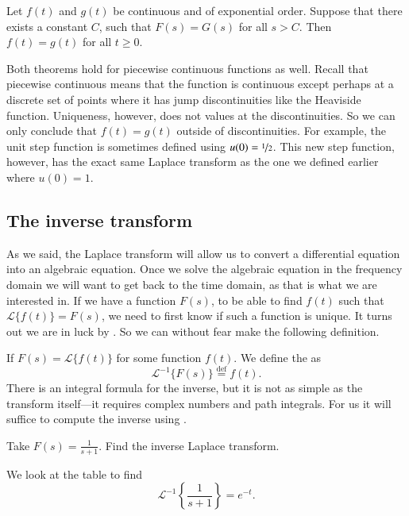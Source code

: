 \documentclass[12pt]{book}
\begin{document}
\begin{theorem}[Uniqueness] \label{lt:uniqthm}
Let $f(t)$ and $g(t)$ be continuous and of exponential order.
Suppose that there exists a constant $C$,
such that $F(s) = G(s)$ for all $s > C$.
Then $f(t) = g(t)$ for all $t \geq 0$.
\end{theorem}

Both theorems hold for piecewise continuous functions as well.
Recall that piecewise continuous means that the function
is continuous except perhaps at a discrete set of points where it has jump
discontinuities like the Heaviside function.  Uniqueness, however, does
not  values at the discontinuities.  So we can only conclude that
$f(t) = g(t)$ outside of discontinuities.  For example, the unit step
function is sometimes defined using $u(0) = \nicefrac{1}{2}$.  This new
step function, however, has the exact same Laplace transform
as the one we defined earlier where $u(0) = 1$.

\subsection{The inverse transform}

As we said, the Laplace transform will allow us to convert a differential
equation into an algebraic equation.  Once we solve the
algebraic equation in the frequency domain we will want to get back to the
time domain, as that is what we are interested in.
If we have a function $F(s)$, to be able
to find $f(t)$ such that $\mathcal{L} \{ f(t) \} = F(s)$, we need to first
know if such a function is unique.  It turns out we are in luck by
.  So we can without fear make the following
definition.

If $F(s) = \mathcal{L} \{ f(t) \}$ for some function $f(t)$.  We define the
\emph{} as
\begin{equation*}
{\mathcal{L}}^{-1} \{ F(s) \} \overset{\text{def}}{=} f(t) .
\end{equation*}
There is an integral formula for the inverse, but it is not as simple
as the transform itself---it requires complex numbers and path integrals.
For us it will
suffice to
compute the inverse using .

\begin{example}
Take
$F(s) = \frac{1}{s+1}$.  Find the inverse Laplace transform.

We look at the table to find
\begin{equation*}
{\mathcal{L}}^{-1} \left\{ \frac{1}{s+1} \right\} = 
e^{-t} .
\end{equation*}
\end{example}
\end{document}
